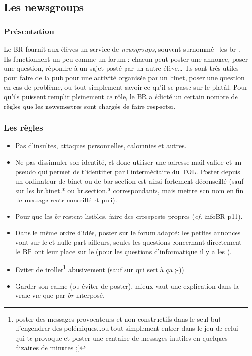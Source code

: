 \subsection{Les newsgroups}
\label{newsgroups}
\subsubsection{Présentation}
Le BR fournit aux élèves un service de \emph{newsgroups}, souvent surnommé \guillemotleft~les br~\guillemotright . Ils fonctionnent un peu comme un
forum : chacun peut poster une annonce, poser une question,
 répondre à un sujet posté par un autre élève\ldots\
Ils sont très utiles pour faire de la pub pour une activité
organisée par un binet, poser une question en cas de problème, ou
tout simplement savoir ce qu'il se passe sur le platâl. Pour qu'ils
puissent remplir pleinement ce rôle, le BR a édicté un certain
nombre de règles que les newsmestres sont chargés de faire
respecter.

\subsubsection{Les règles}
\begin{itemize}
 \item Pas d'insultes, attaques personnelles, calomnies et autres.
 \item Ne pas dissimuler son identité, et donc utiliser une adresse mail valide
       et un pseudo qui permet de t'identifier par l'intermédiaire du TOL. Poster depuis un ordinateur de binet ou de bar section est ainsi fortement déconseillé (sauf sur les br.binet.* ou br.section.* correspondants, mais mettre son nom en fin de message reste conseillé et poli).
 \item Pour que les {\it br} restent lisibles, faire des crossposts propres (\emph{cf.} infoBR p11).
 \item Dans le même ordre d'idée, poster sur le forum adapté:
       les petites annonces vont sur le  et nulle part ailleurs,
       seules les questions concernant directement le BR ont leur place sur le 
       (pour les questions d'informatique il y a les \ngname{br.informatique.*}).
 \item Eviter de troller\footnote{poster des messages provocateurs et non constructifs dans le seul but
       d'engendrer des polémiques\ldots ou tout simplement entrer dans le jeu de celui qui te provoque
       et poster une centaine de messages inutiles en quelques dizaines de minutes ;)} abusivement
       (sauf sur \ngname{br.binet.polemix} qui sert à ça ;-))
 \item Garder son calme (ou éviter de poster), mieux vaut une explication dans la vraie vie
       que par {\it br} interposé.
\end{itemize}

